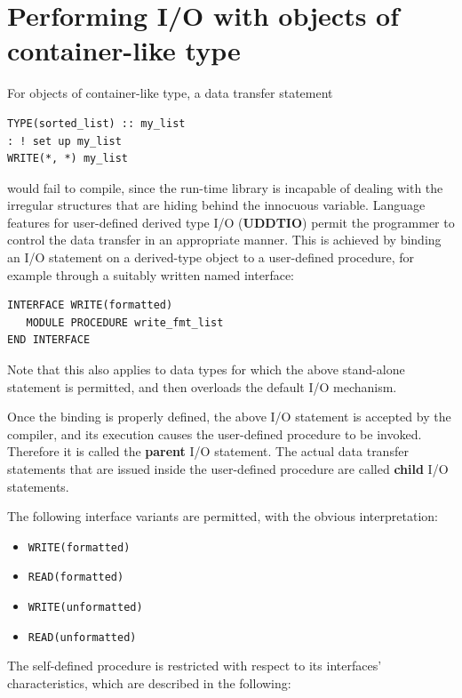 \documentclass[
  paper=a4,
  ,captions=tableheading
]{scrartcl}
\newcommand{\passthrough}[1]{#1}
\providecommand{\tightlist}{%
  \setlength{\itemsep}{0pt}\setlength{\parskip}{0pt}}
\begin{document}
\section{Performing I/O with objects of container-like
type}\label{performing-io-with-objects-of-container-like-type}

For objects of container-like type, a data transfer statement

\begin{lstlisting}
TYPE(sorted_list) :: my_list
: ! set up my_list
WRITE(*, *) my_list
\end{lstlisting}

would fail to compile, since the run-time library is incapable of
dealing with the irregular structures that are hiding behind the
innocuous variable. Language features for user-defined derived type I/O
(\textbf{UDDTIO}) permit the programmer to control the data transfer in
an appropriate manner. This is achieved by binding an I/O statement on a
derived-type object to a user-defined procedure, for example through a
suitably written named interface:

\begin{lstlisting}
INTERFACE WRITE(formatted)
   MODULE PROCEDURE write_fmt_list
END INTERFACE
\end{lstlisting}

Note that this also applies to data types for which the above
stand-alone statement is permitted, and then overloads the default I/O
mechanism.

Once the binding is properly defined, the above I/O statement is
accepted by the compiler, and its execution causes the user-defined
procedure to be invoked. Therefore it is called the \textbf{parent} I/O
statement. The actual data transfer statements that are issued inside
the user-defined procedure are called \textbf{child} I/O statements.

The following interface variants are permitted, with the obvious
interpretation:

\begin{itemize}
\tightlist
\item
  \passthrough{\lstinline!WRITE(formatted)!}
\item
  \passthrough{\lstinline!READ(formatted)!}
\item
  \passthrough{\lstinline!WRITE(unformatted)!}
\item
  \passthrough{\lstinline!READ(unformatted)!}
\end{itemize}

The self-defined procedure is restricted with respect to its interfaces'
characteristics, which are described in the following:
\end{document}
